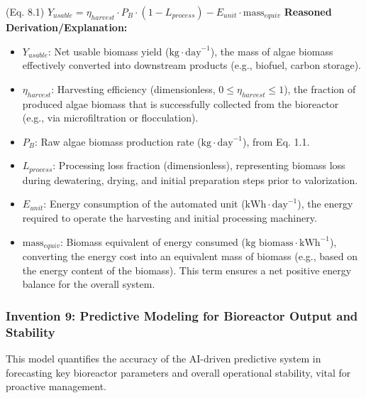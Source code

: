 \documentclass{article}
\newenvironment{reasonedderivation}{
    \textbf{Reasoned Derivation/Explanation:}
    \begin{itemize}
}{
    \end{itemize}
}
\begin{document}
(Eq. 8.1) $Y_{usable} = \eta_{harvest} \cdot P_B \cdot (1 - L_{process}) - E_{unit} \cdot \text{mass}_{equiv}$
\begin{reasonedderivation}
    \item $Y_{usable}$: Net usable biomass yield ($\text{kg} \cdot \text{day}^{-1}$), the mass of algae biomass effectively converted into downstream products (e.g., biofuel, carbon storage).
    \item $\eta_{harvest}$: Harvesting efficiency (dimensionless, $0 \le \eta_{harvest} \le 1$), the fraction of produced algae biomass that is successfully collected from the bioreactor (e.g., via microfiltration or flocculation).
    \item $P_B$: Raw algae biomass production rate ($\text{kg} \cdot \text{day}^{-1}$), from Eq. 1.1.
    \item $L_{process}$: Processing loss fraction (dimensionless), representing biomass loss during dewatering, drying, and initial preparation steps prior to valorization.
    \item $E_{unit}$: Energy consumption of the automated unit ($\text{kWh} \cdot \text{day}^{-1}$), the energy required to operate the harvesting and initial processing machinery.
    \item $\text{mass}_{equiv}$: Biomass equivalent of energy consumed ($\text{kg biomass} \cdot \text{kWh}^{-1}$), converting the energy cost into an equivalent mass of biomass (e.g., based on the energy content of the biomass). This term ensures a net positive energy balance for the overall system.
\end{reasonedderivation}

\subsubsection*{Invention 9: Predictive Modeling for Bioreactor Output and Stability}
This model quantifies the accuracy of the AI-driven predictive system in forecasting key bioreactor parameters and overall operational stability, vital for proactive management.
\end{document}
